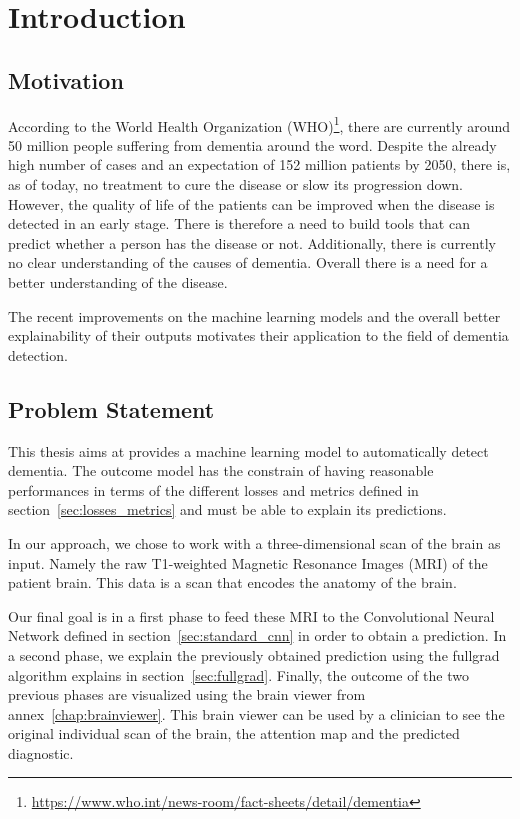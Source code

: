 \chapter{Introduction}

\section{Motivation}
\label{sec:motivation}
According to the World Health Organization (WHO)\footnote{\href{https://www.who.int/news-room/fact-sheets/detail/dementia}{https://www.who.int/news-room/fact-sheets/detail/dementia}}, there are currently around 50 million people suffering from dementia around the word. Despite the already high number of cases and an expectation of 152 million patients by 2050, there is, as of today, no treatment to cure the disease or slow its progression down. However, the quality of life of the patients can be improved when the disease is detected in an early stage. There is therefore a need to build tools that can predict whether a person has the disease or not. Additionally, there is currently no clear understanding of the causes of dementia. Overall  there is a need for a better understanding of the disease.

The recent improvements on the machine learning models and the overall better explainability of their outputs motivates their application to the field of dementia detection.

\section{Problem Statement}
\label{sec:problem_statement}
This thesis aims at provides a machine learning model to automatically detect dementia. The outcome model has the constrain of having reasonable performances in terms of the different losses and metrics defined in section~\ref{sec:losses_metrics} and must be able to explain its predictions.

In our approach, we chose to work with a three-dimensional scan of the brain as input. Namely the raw T1-weighted Magnetic Resonance Images (MRI) of the patient brain. This data is a scan that encodes the anatomy of the brain. 

Our final goal is in a first phase to feed these MRI to the Convolutional Neural Network defined in section~\ref{sec:standard_cnn} in order to obtain a prediction. In a second phase, we explain the previously obtained prediction using the fullgrad algorithm explains in section~\ref{sec:fullgrad}. Finally, the outcome of the two previous phases are visualized using the brain viewer from annex~\ref{chap:brainviewer}. This brain viewer can be used by a clinician to see the original individual scan of the brain, the attention map and the predicted diagnostic.



